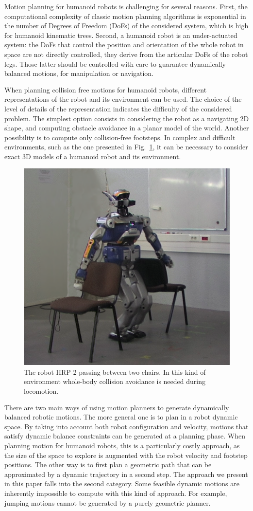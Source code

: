 \documentclass{article}
\begin{document}
Motion planning for humanoid robots is challenging for several reasons. First,
the computational complexity of classic motion planning algorithms is exponential
in the number of Degrees of Freedom (DoFs) of the considered system, which is
high for humanoid kinematic trees. Second, a humanoid robot is an under-actuated system:
the DoFs that control the position and orientation of the whole robot in space
are not directly controlled, they derive from the articular DoFs of the robot legs.
Those latter should be controlled with care to guarantee dynamically balanced motions,
for manipulation or navigation.

When planning collision free motions for humanoid robots, different representations
of the robot and its environment can be used. The choice of the level of details of
the representation indicates the difficulty of the considered problem. The simplest
option consists in considering the robot as a navigating 2D shape, and computing 
obstacle avoidance in a planar model of the world. Another possibility is to 
compute only collision-free footsteps. 
In complex and difficult environments, such as the one presented in Fig.~\ref{fig:couv},
it can be necessary to consider exact 3D models of a humanoid robot and its environment.


\begin{figure}[h]
\centering
\includegraphics[width=0.6\linewidth]{pics/chairs/couv.png}
\caption{The robot HRP-2 passing between two chairs. In this kind of
  environment whole-body collision avoidance is needed during
  locomotion.} 
\label{fig:couv}
\end{figure}

There are two main ways of using motion planners to generate dynamically balanced robotic motions.
The more general one is to plan in a robot dynamic space. By taking into account both robot
configuration and velocity, motions that satisfy dynamic balance constraints can be generated
at a planning phase. When planning motion for humanoid robots, this is a particularly costly
approach, as the size of the space to explore is augmented with the robot velocity and footstep
positions. The other way is to first plan  a geometric path that can be approximated by a
dynamic trajectory in a second step. The approach we present in this paper falls into the second 
category. Some feasible dynamic motions are inherently impossible to compute with this kind
of approach. For example, jumping motions cannot be generated by a purely geometric planner.
\end{document}
